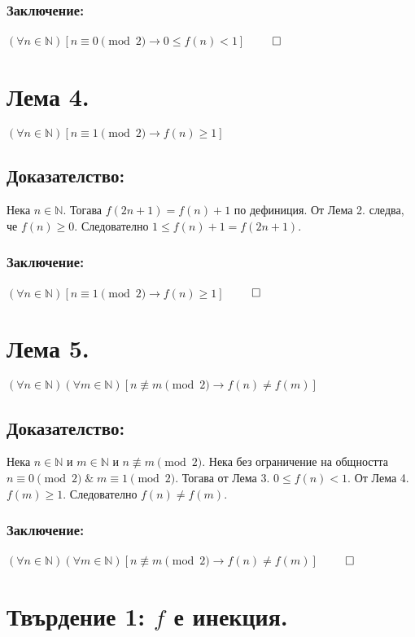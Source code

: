 \documentclass[a4paper, 12pt, oneside]{article}
\begin{document}
\subsubsection*{Заключение:}
\((\forall n \in \mathbb{N})[n \equiv 0 \pmod{2} \longrightarrow 0 \leq f(n) < 1]\) \(\qed\)
\section*{Лема 4.}
\((\forall n \in \mathbb{N})[n \equiv 1 \pmod{2} \longrightarrow f(n) \geq 1]\)
\subsection*{Доказателство:}
Нека \(n \in \mathbb{N}\).
Тогава \(f(2n + 1) = f(n) + 1\) по дефиниция.
От Лема 2. следва, че \(f(n) \geq 0\).
Следователно \(1 \leq f(n) + 1 = f(2n + 1)\).
\subsubsection*{Заключение:}
\((\forall n \in \mathbb{N})[n \equiv 1 \pmod{2} \longrightarrow f(n) \geq 1]\) \(\qed\)
\section*{Лема 5.}
\((\forall n \in \mathbb{N})(\forall m \in \mathbb{N})[n \not\equiv m \pmod{2} \longrightarrow f(n) \neq f(m)]\)
\subsection*{Доказателство:}
Нека \(n \in \mathbb{N}\) и \(m \in \mathbb{N}\) и \(n \not\equiv m \pmod{2}\).
Нека без ограничение на общността \(n \equiv 0 \pmod{2} \; \& \; m \equiv 1 \pmod{2}\).
Тогава от Лема 3. \(0 \leq f(n) < 1\).
От Лема 4. \(f(m) \geq 1\).
Следователно \(f(n) \neq f(m)\).
\subsubsection*{Заключение:}
\((\forall n \in \mathbb{N})(\forall m \in \mathbb{N})[n \not\equiv m \pmod{2} \longrightarrow f(n) \neq f(m)]\) \(\qed\)
\section*{Твърдение 1: \(f\) е инекция.}
\end{document}
